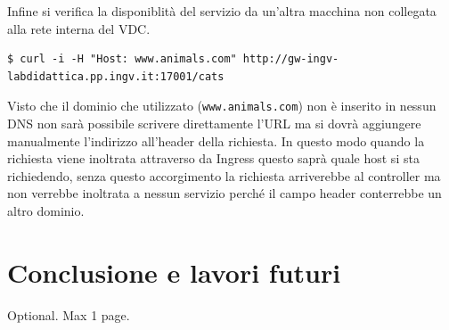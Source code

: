 \documentclass[12pt,a4paper,openright,twoside]{book}
\begin{document}
Infine si verifica la disponiblità del servizio da un'altra macchina non collegata alla rete interna del VDC. 
\begin{lstlisting}
$ curl -i -H "Host: www.animals.com" http://gw-ingv-labdidattica.pp.ingv.it:17001/cats
\end{lstlisting}
Visto che il dominio che utilizzato (\texttt{www.animals.com}) non è inserito in nessun DNS non sarà possibile scrivere direttamente l'URL ma si dovrà aggiungere manualmente
l'indirizzo all'header della richiesta. In questo modo quando la richiesta viene inoltrata attraverso da Ingress questo saprà quale host si sta richiedendo,
senza questo accorgimento la richiesta arriverebbe al controller ma non verrebbe inoltrata a nessun servizio perché il campo header conterrebbe un altro dominio. 

\chapter{Conclusione e lavori futuri}
%
%


\backmatter

\nocite{*} %




\begin{acknowledgements} %
Optional. Max 1 page.
\end{acknowledgements}
\end{document}
